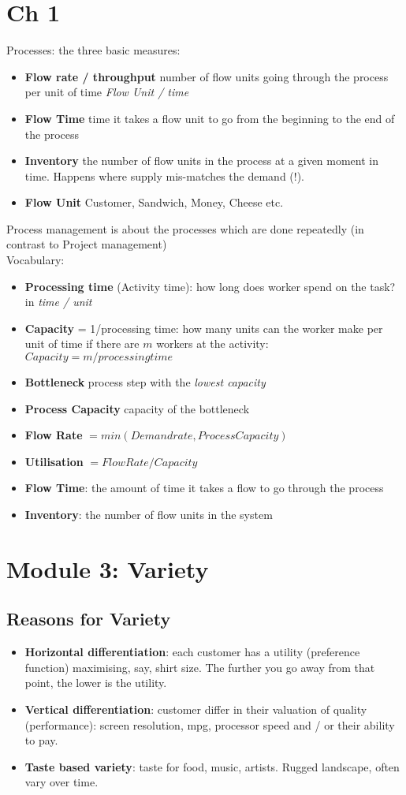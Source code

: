 \documentclass{scrartcl}
\begin{document}
\section{ Ch 1}
\label{sec:01-01}
Processes: the three basic measures:
\begin{itemize}
\item {\bf Flow rate / throughput} number of flow units going through the process per unit of time {\em Flow Unit / time}
\item {\bf Flow Time} time it takes a flow unit to go from the beginning to the end of the process
\item {\bf Inventory} the number of flow units in the process at a given moment in time. Happens where supply mis-matches the demand (!).
\item {\bf Flow Unit} Customer, Sandwich, Money, Cheese etc.
\end{itemize}
Process management is about the processes which are done repeatedly (in contrast to Project management) \\
Vocabulary:
\begin{itemize}
\item {\bf Processing time} (Activity time): how long does worker spend on the task? in {\em time / unit}
\item {\bf Capacity} = 1/processing time: how many units can the worker make per unit of time if there are $m$ workers at the activity: $Capacity = m / processing time$
\item {\bf Bottleneck} process step with the {\em lowest capacity}
\item {\bf Process Capacity} capacity of the bottleneck
\item {\bf Flow Rate} $=min(Demand rate, Process Capacity)$
\item {\bf Utilisation} $=Flow Rate / Capacity$
\item {\bf Flow Time}: the amount of time it takes a flow to go through the process
\item {\bf Inventory}: the number of flow units in the system
\end{itemize}

\section{Module 3: Variety}
\label{sec:05}
\subsection{Reasons for  Variety}
\label{sec:05-01}
\begin{itemize}
\item {\bf Horizontal differentiation}: each customer has a utility (preference function) maximising, say, shirt size. The further you go away from that point, the lower is the utility.
\item {\bf Vertical differentiation}: customer differ in their valuation of quality (performance): screen resolution, mpg, processor speed and / or their ability to pay.
\item {\bf Taste based variety}: taste for food, music, artists. Rugged landscape, often vary over time.
\end{itemize}
\end{document}
